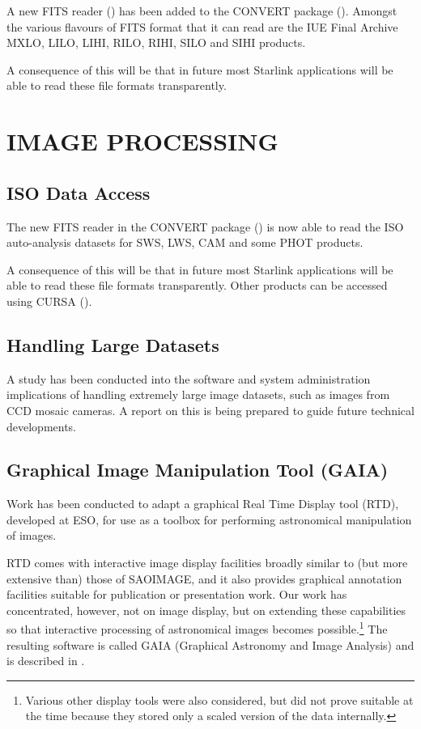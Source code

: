 A new FITS reader () has been added to
the CONVERT package (). Amongst the various
flavours of FITS format that it can read are the IUE Final Archive
MXLO, LILO, LIHI, RILO, RIHI, SILO and SIHI products.

A consequence of this will be that in future most Starlink
applications will be able to read these file formats transparently.

\section{IMAGE PROCESSING}

\subsection{ISO Data Access}

The new  FITS reader in the CONVERT
package () is now able to read the ISO
auto-analysis datasets for SWS, LWS, CAM and some PHOT products.

A consequence of this will be that in future most Starlink
applications will be able to read these file formats transparently.
Other products can be accessed using CURSA ().

\subsection{Handling Large Datasets}

A study has been conducted into the software and system administration
implications of handling extremely large image datasets, such as
images from CCD mosaic cameras. A report on this is being prepared to
guide future technical developments.

\subsection{\label{ip:GAIA}Graphical Image Manipulation Tool (GAIA)}

Work has been conducted to adapt a graphical Real Time Display tool
(RTD), developed at ESO, for use as a toolbox for performing
astronomical manipulation of images.

RTD comes with interactive image display facilities broadly similar to
(but more extensive than) those of SAOIMAGE, and it also provides
graphical annotation facilities suitable for publication or
presentation work.  Our work has concentrated, however, not on image
display, but on extending these capabilities so that interactive
processing of astronomical images becomes possible.\footnote{Various
other display tools were also considered, but did not prove suitable
at the time because they stored only a scaled version of the data
internally.} The resulting software is called GAIA (Graphical
Astronomy and Image Analysis) and is described in
.

